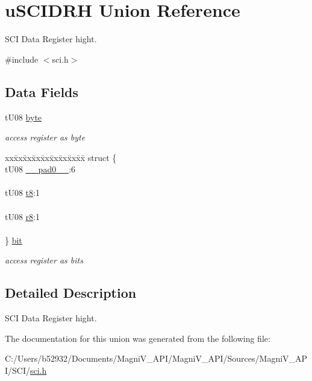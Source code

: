 \hypertarget{unionu_s_c_i_d_r_h}{}\section{u\+S\+C\+I\+D\+R\+H Union Reference}
\label{unionu_s_c_i_d_r_h}


S\+C\+I Data Register hight.  




{\ttfamily \#include $<$sci.\+h$>$}

\subsection*{Data Fields}
\begin{DoxyCompactItemize}
\item 
\hypertarget{unionu_s_c_i_d_r_h_aba308d63db050aed25cfd36c37e41ad4}{}t\+U08 \hyperlink{unionu_s_c_i_d_r_h_aba308d63db050aed25cfd36c37e41ad4}{byte}\label{unionu_s_c_i_d_r_h_aba308d63db050aed25cfd36c37e41ad4}

\begin{DoxyCompactList}\small\item\em access register as byte \end{DoxyCompactList}\item 
\hypertarget{unionu_s_c_i_d_r_h_a91496095629a9f3385ab121e4cacc6d0}{}\begin{tabbing}
xx\=xx\=xx\=xx\=xx\=xx\=xx\=xx\=xx\=\kill
struct \{\\
\>tU08 \hyperlink{unionu_s_c_i_d_r_h_aa3e5250d311ceb1525f9adf38f0d7982}{\_\_pad0\_\_}:6\\
\>\\
\>tU08 \hyperlink{unionu_s_c_i_d_r_h_a35088a6ae8be09476362407aad8d9d23}{t8}:1\\
\>\\
\>tU08 \hyperlink{unionu_s_c_i_d_r_h_a0131da9485620e4de44735e11a64375b}{r8}:1\\
\>\\
\} \hyperlink{unionu_s_c_i_d_r_h_a91496095629a9f3385ab121e4cacc6d0}{bit}\label{unionu_s_c_i_d_r_h_a91496095629a9f3385ab121e4cacc6d0}
\\

\end{tabbing}\begin{DoxyCompactList}\small\item\em access register as bits \end{DoxyCompactList}\end{DoxyCompactItemize}


\subsection{Detailed Description}
S\+C\+I Data Register hight. 

The documentation for this union was generated from the following file\+:\begin{DoxyCompactItemize}
\item 
C\+:/\+Users/b52932/\+Documents/\+Magni\+V\+\_\+\+A\+P\+I/\+Magni\+V\+\_\+\+A\+P\+I/\+Sources/\+Magni\+V\+\_\+\+A\+P\+I/\+S\+C\+I/\hyperlink{sci_8h}{sci.\+h}\end{DoxyCompactItemize}
